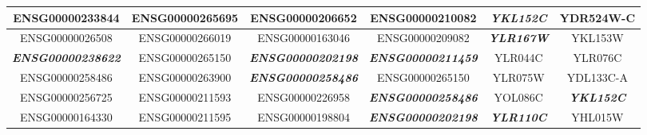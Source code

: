 \documentclass{article}
\begin{document}
\begin{table}[]
{\begin{tabular}{cc|cc|cc}
                \multicolumn{1}{c|}{ENSG00000233844} &
                ENSG00000265695 &
                \multicolumn{1}{c|}{ENSG00000206652} &
                \textbf{ENSG00000210082} &
                \multicolumn{1}{c|}{\textit{\textbf{YKL152C}}} &
                YDR524W-C \\ \hline
                \multicolumn{1}{c|}{ENSG00000026508} &
                ENSG00000266019 &
                \multicolumn{1}{c|}{ENSG00000163046} &
                ENSG00000209082 &
                \multicolumn{1}{c|}{\textit{\textbf{YLR167W}}} &
                YKL153W \\ \hline
                \multicolumn{1}{c|}{\textit{\textbf{ENSG00000238622}}} &
                ENSG00000265150 &
                \multicolumn{1}{c|}{\textit{\textbf{ENSG00000202198}}} &
                \textit{\textbf{ENSG00000211459}} &
                \multicolumn{1}{c|}{YLR044C} &
                YLR076C \\ \hline
                \multicolumn{1}{c|}{ENSG00000258486} &
                ENSG00000263900 &
                \multicolumn{1}{c|}{\textit{\textbf{ENSG00000258486}}} &
                ENSG00000265150 &
                \multicolumn{1}{c|}{YLR075W} &
                YDL133C-A \\ \hline
                \multicolumn{1}{c|}{ENSG00000256725} &
                ENSG00000211593 &
                \multicolumn{1}{c|}{ENSG00000226958} &
                \textit{\textbf{ENSG00000258486}} &
                \multicolumn{1}{c|}{YOL086C} &
                \textit{\textbf{YKL152C}} \\ \hline
                \multicolumn{1}{c|}{ENSG00000164330} &
                ENSG00000211595 &
                \multicolumn{1}{c|}{ENSG00000198804} &
                \textit{\textbf{ENSG00000202198}} &
                \multicolumn{1}{c|}{\textit{\textbf{YLR110C}}} &
                YHL015W
            \end{tabular}%
        }
    \end{table}
\end{document}
